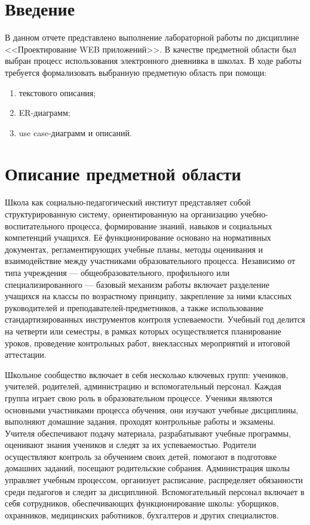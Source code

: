 \documentclass[a4paper, final]{article}
\begin{document}
\newpage

\tableofcontents

\newpage

\cleardoublepage
{}

\section*{Введение}
В данном отчете представлено выполнение лабораторной работы по дисциплине <<Проектирование WEB приложений>>. В качестве предметной области был выбран процесс использования электронного дневнивка в школах.
В ходе работы требуется формализовать выбранную предметную область при помощи:
\begin{enumerate}
    \item текстового описания;
    \item ER-диаграмм;
    \item use case-диаграмм и описаний.
\end{enumerate}

\newpage
\section{Описание предметной области}
Школа как социально-педагогический институт представляет собой структурированную систему, ориентированную на организацию учебно-воспитательного процесса, формирование знаний, навыков и социальных компетенций учащихся. Её функционирование основано на нормативных документах, регламентирующих учебные планы, методы оценивания и взаимодействие между участниками образовательного процесса. Независимо от типа учреждения --- общеобразовательного, профильного или специализированного --- базовый механизм работы включает разделение учащихся на классы по возрастному принципу, закрепление за ними классных руководителей и преподавателей-предметников, а также использование стандартизированных инструментов контроля успеваемости. Учебный год делится на четверти или семестры, в рамках которых осуществляется планирование уроков, проведение контрольных работ, внеклассных мероприятий и итоговой аттестации.

Школьное сообщество включает в себя несколько ключевых групп: учеников, учителей, родителей, администрацию и вспомогательный персонал. Каждая группа играет свою роль в образовательном процессе. Ученики являются основными участниками процесса обучения, они изучают учебные дисциплины, выполняют домашние задания, проходят контрольные работы и экзамены. Учителя обеспечивают подачу материала, разрабатывают учебные программы, оценивают знания учеников и следят за их успеваемостью. Родители осуществляют контроль за обучением своих детей, помогают в подготовке домашних заданий, посещают родительские собрания. Администрация школы управляет учебным процессом, организует расписание, распределяет обязанности среди педагогов и следит за дисциплиной. Вспомогательный персонал включает в себя сотрудников, обеспечивающих функционирование школы: уборщиков, охранников, медицинских работников, бухгалтеров и других специалистов.
\end{document}

